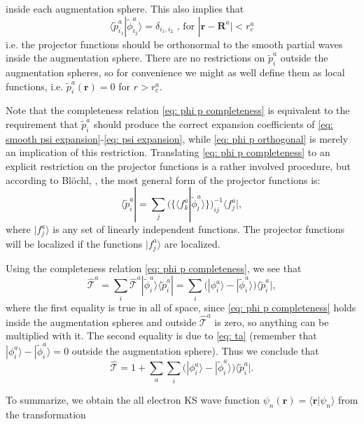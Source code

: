 \documentclass[a4paper]{article}
\newcommand{\f}[1]{\mathbf{#1}}
\newcommand{\s}[1]{\tilde{#1}}
\newcommand{\T}{\hat{\mathcal{T}}}
\newcommand{\bra}[1]{\langle #1 |}
\newcommand{\ket}[1]{| #1 \rangle}
\newcommand{\braket}[2]{\langle #1 | #2 \rangle}
\begin{document}
%
inside each augmentation sphere. This also implies that
%
\begin{equation}\label{eq: phi p orthogonal}
\braket{\s{p}_{i_1}^a}{\s{\phi}_{i_2}^a}=\delta_{i_1,i_2} \text{~, for } |\f{r}-\f{R}^a|<r_c^a
\end{equation}
%
i.e. the projector functions should be orthonormal to the smooth
partial waves inside the augmentation sphere. There are no
restrictions on $\s{p}_i^a$ outside the augmentation spheres, so
for convenience we might as well define them as local functions,
i.e. $\s{p}_i^a(\f{r})=0$ for $r>r_c^a$.
\par Note that the completeness relation \ref{eq: phi p
completeness} is equivalent to the requirement that $\s{p}_i^a$
should produce the correct expansion coefficients of \ref{eq:
smooth psi expansion}-\ref{eq: psi expansion}, while \ref{eq:
phi p orthogonal} is merely an implication of this restriction.
Translating \ref{eq: phi p completeness} to an explicit
restriction on the projector functions is a rather involved
procedure, but according to Bl{\"o}chl, \cite{Blochl1994}, the most
general form of the projector functions is:
%
\begin{equation}\label{eq: projector general}
\bra{\s{p}_i^a} = \sum_j
(\{\braket{f_k^a}{\s{\phi}_l^a}\})^{-1}_{ij}\bra{f_j^a},
\end{equation}
%
where $\ket{f_j^a}$ is any set of linearly independent functions.
The projector functions will be localized if the functions
$\ket{f_j^a}$ are localized.
\par Using the completeness relation \ref{eq: phi p
completeness}, we see that
%
\begin{equation*}
\T^a =\sum_i \T^a\ket{\s{\phi}_i^a}\bra{\s{p}_i^a} = \sum_i
\big(\ket{\phi_i^a} - \ket{\s{\phi}_i^a}\big) \bra{\s{p}_i^a},
\end{equation*}
%
where the first equality is true in  all of space, since
\ref{eq: phi p completeness} holds inside the augmentation
spheres and outside $\T^a$ is zero, so anything can be multiplied
with it. The second equality is due to \ref{eq: ta} (remember
that $\ket{\phi_i^a} - \ket{\s{\phi}_i^a}=0$ outside the
augmentation sphere). Thus we conclude that
%
\begin{equation}\label{eq: T operator}
\T =1+ \sum_a\sum_i \big(\ket{\phi_i^a} - \ket{\s{\phi}_i^a}\big)
\bra{\s{p}_i^a}.
\end{equation}
%
\par To summarize, we obtain the all electron KS wave function
$\psi_n(\f{r})=\braket{\f{r}}{\psi_n}$ from the transformation
\end{document}
